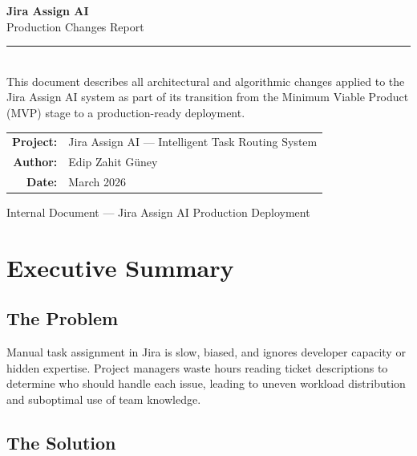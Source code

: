 \documentclass[12pt, a4paper]{article}
\begin{document}
\begin{titlepage}
    \centering
    \vspace*{3cm}

    {\Huge\bfseries Jira Assign AI\\[0.3cm]}
    {\LARGE\color{primaryblue} Production Changes Report\\[1cm]}

    \rule{0.6\textwidth}{1pt}\\[1.5cm]

    {\large
    This document describes all architectural and algorithmic changes
    applied to the Jira Assign AI system as part of its transition from
    the Minimum Viable Product (MVP) stage to a production-ready deployment.\\[2cm]
    }

    \begin{tabular}{rl}
        \textbf{Project:} & Jira Assign AI — Intelligent Task Routing System \\
        \textbf{Author:}  & Edip Zahit Güney \\
        \textbf{Date:}    & March 2026 \\
    \end{tabular}

    \vfill
    {\small\color{gray} Internal Document — Jira Assign AI Production Deployment}
\end{titlepage}

\tableofcontents
\newpage

\section{Executive Summary}

\subsection{The Problem}

Manual task assignment in Jira is slow, biased, and ignores developer capacity or hidden expertise. Project managers waste hours reading ticket descriptions to determine who should handle each issue, leading to uneven workload distribution and suboptimal use of team knowledge.

\subsection{The Solution}
\end{document}

